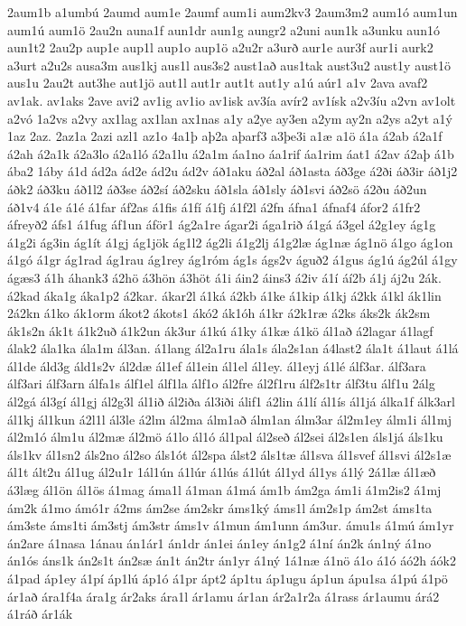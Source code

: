 {2aum1b
a1umbú
2aumd
aum1e
2aumf
aum1i
aum2kv3
2aum3m2
aum1ó
aum1un
aum1ú
aum1ö
2au2n
auna1f
aun1dr
aun1g
aungr2
a2uni
aun1k
a3unku
aun1ó
aun1t2
2au2p
aup1e
aup1l
aup1o
aup1ö
a2u2r
a3urð
aur1e
aur3f
aur1i
aurk2
a3urt
a2u2s
ausa3m
aus1kj
aus1l
aus3s2
aust1að
aus1tak
aust3u2
aust1y
aust1ö
aus1u
2au2t
aut3he
aut1jö
aut1l
aut1r
aut1t
aut1y
a1ú
aúr1
a1v
2ava
avaf2
av1ak.
av1aks
2ave
avi2
av1ig
av1io
av1isk
av3ía
avír2
av1ísk
a2v3íu
a2vn
av1olt
a2vó
1a2vs
a2vy
ax1lag
ax1lan
ax1nas
a1y
a2ye
ay3en
a2ym
ay2n
a2ys
a2yt
a1ý
1az
2az.
2az1a
2azi
azl1
az1o
4a1þ
aþ2a
aþarf3
a3þe3i
a1æ
a1ö
á1a
á2ab
á2a1f
á2ah
á2a1k
á2a3lo
á2a1ló
á2a1lu
á2a1m
áa1no
áa1rif
áa1rim
áat1
á2av
á2aþ
á1b
ába2
1áby
á1d
ád2a
ád2e
ád2u
ád2v
áð1aku
áð2al
áð1asta
áð3ge
á2ði
áð3ir
áð1j2
áðk2
áð3ku
áð1l2
áð3se
áð2sí
áð2sku
áð1sla
áð1sly
áð1svi
áð2sö
á2ðu
áð2un
áð1v4
á1e
á1é
á1far
áf2as
á1fis
á1fí
á1fj
á1f2l
á2fn
áfna1
áfnaf4
áfor2
á1fr2
áfreyð2
áfs1
á1fug
áf1un
áför1
ág2a1re
ágar2i
ága1rið
á1gá
á3gel
á2g1ey
ág1g
á1g2i
ág3in
ág1ít
á1gj
ág1jök
ág1l2
ág2li
á1g2lj
á1g2læ
ág1næ
ág1nö
á1go
ág1on
á1gó
á1gr
ág1rad
ág1rau
ág1rey
ág1róm
ág1s
ágs2v
águð2
á1gus
ág1ú
ág2úl
á1gy
ágæs3
á1h
áhank3
á2hö
á3hön
á3höt
á1i
áin2
áins3
á2iv
á1í
áí2b
á1j
áj2u
2ák.
á2kad
áka1g
áka1p2
á2kar.
ákar2l
á1ká
á2kb
á1ke
á1kip
á1kj
á2kk
á1kl
ák1lin
2á2kn
á1ko
ák1orm
ákot2
ákots1
ákó2
ák1óh
á1kr
á2k1ræ
á2ks
áks2k
ák2sm
ák1s2n
ák1t
á1k2uð
á1k2un
ák3ur
á1kú
á1ky
á1kæ
á1kö
ál1að
á2lagar
á1lagf
álak2
ála1ka
ála1m
ál3an.
á1lang
ál2a1ru
ála1s
ála2s1an
á4last2
ála1t
á1laut
á1lá
ál1de
áld3g
áld1s2v
ál2dæ
ál1ef
ál1ein
ál1el
ál1ey.
ál1eyj
á1lé
álf3ar.
álf3ara
álf3ari
álf3arn
álfa1s
álf1el
álf1la
álf1o
ál2fre
ál2f1ru
álf2s1tr
álf3tu
álf1u
2álg
ál2gá
ál3gí
ál1gj
ál2g3l
ál1ið
ál2iða
ál3iði
álif1
á2lin
á1lí
ál1ís
ál1já
álka1f
álk3arl
ál1kj
ál1kun
á2l1l
ál3le
á2lm
ál2ma
álm1að
álm1an
álm3ar
ál2m1ey
álm1i
ál1mj
ál2m1ó
álm1u
ál2mæ
ál2mö
á1lo
ál1ó
ál1pal
ál2seð
ál2sei
ál2s1en
áls1já
áls1ku
áls1kv
ál1sn2
áls2no
ál2so
áls1ót
ál2spa
álst2
áls1tæ
ál1sva
ál1svef
ál1svi
ál2s1æ
ál1t
ált2u
ál1ug
ál2u1r
1ál1ún
á1lúr
á1lús
á1lút
ál1yd
ál1ys
á1lý
2á1læ
ál1æð
á3læg
ál1ön
ál1ös
á1mag
áma1l
á1man
á1má
ám1b
ám2ga
ám1i
á1m2is2
á1mj
ám2k
á1mo
ámó1r
á2ms
ám2se
ám2skr
áms1ký
áms1l
ám2s1p
ám2st
áms1ta
ám3ste
áms1ti
ám3stj
ám3str
áms1v
á1mun
ám1unn
ám3ur.
ámu1s
á1mú
ám1yr
án2are
á1nasa
1ánau
án1ár1
án1dr
án1ei
án1ey
án1g2
á1ní
án2k
án1ný
á1no
án1ós
áns1k
án2s1t
án2sæ
án1t
án2tr
án1yr
á1ný
1á1næ
á1nö
á1o
á1ó
áó2h
áók2
á1pad
áp1ey
á1pí
áp1lú
áp1ó
á1pr
ápt2
áp1tu
áp1ugu
áp1un
ápu1sa
á1pú
á1pö
ár1að
ára1f4a
ára1g
ár2aks
ára1l
ár1amu
ár1an
ár2a1r2a
á1rass
ár1aumu
árá2
á1ráð
ár1ák
}
